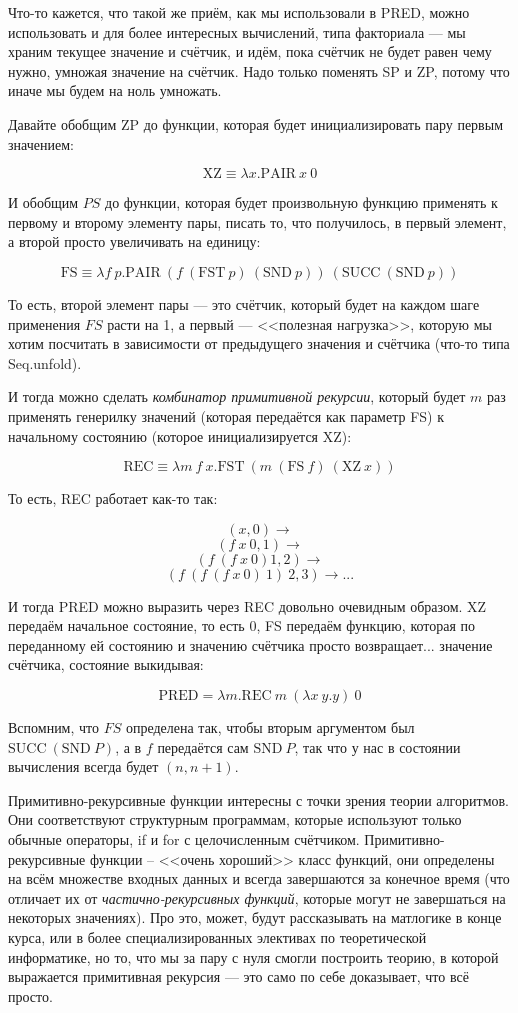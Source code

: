 \documentclass[a5paper]{article}
\begin{document}
Что-то кажется, что такой же приём, как мы использовали в PRED, можно использовать и для более интересных вычислений, типа факториала --- мы храним текущее значение и счётчик, и идём, пока счётчик не будет равен чему нужно, умножая значение на счётчик. Надо только поменять SP и ZP, потому что иначе мы будем на ноль умножать.

Давайте обобщим ZP до функции, которая будет инициализировать пару первым значением:

$$\mbox{XZ} \equiv \lambda x.\mbox{PAIR}\ x\ 0$$

И обобщим $PS$ до функции, которая будет произвольную функцию применять к первому и второму элементу пары, писать то, что получилось, в первый элемент, а второй просто увеличивать на единицу:

$$\mbox{FS} \equiv \lambda f\ p.\mbox{PAIR}\ (f\ (\mbox{FST}\ p)\ (\mbox{SND}\ p))\ (\mbox{SUCC}\ (\mbox{SND}\ p))$$

То есть, второй элемент пары --- это счётчик, который будет на каждом шаге применения $FS$ расти на 1, а первый --- <<полезная нагрузка>>, которую мы хотим посчитать в зависимости от предыдущего значения и счётчика (что-то типа Seq.unfold).

И тогда можно сделать \textit{комбинатор примитивной рекурсии}, который будет $m$ раз применять генерилку значений (которая передаётся как параметр FS) к начальному состоянию (которое инициализируется XZ):

$$\mbox{REC} \equiv \lambda m\ f\ x.\mbox{FST}\ (m\ (\mbox{FS}\ f)\ (\mbox{XZ}\ x))$$

То есть, REC работает как-то так:

$$(x, 0) \rightarrow$$
$$(f\ x\ 0, 1) \rightarrow$$
$$(f\ (f\ x\ 0) 1, 2) \rightarrow$$
$$(f\ (f\ (f\ x\ 0)\ 1)\ 2, 3) \rightarrow ...$$

И тогда PRED можно выразить через REC довольно очевидным образом. XZ передаём начальное состояние, то есть 0, FS передаём функцию, которая по переданному ей состоянию и значению счётчика просто возвращает... значение счётчика, состояние выкидывая:

$$\mbox{PRED} = \lambda m.\mbox{REC}\ m\ (\lambda x\ y.y)\ 0$$

Вспомним, что $FS$ определена так, чтобы вторым аргументом был $\mbox{SUCC}\ (\mbox{SND}\ P)$, а в $f$ передаётся сам $\mbox{SND}\ P$, так что у нас в состоянии вычисления всегда будет $(n, n + 1)$.

Примитивно-рекурсивные функции интересны с точки зрения теории алгоритмов. Они соответствуют структурным программам, которые используют только обычные операторы, if и for с целочисленным счётчиком. Примитивно-рекурсивные функции -- <<очень хороший>> класс функций, они определены на всём множестве входных данных и всегда завершаются за конечное время (что отличает их от \textit{частично-рекурсивных функций}, которые могут не завершаться на некоторых значениях). Про это, может, будут рассказывать на матлогике в конце курса, или в более специализированных элективах по теоретической информатике, но то, что мы за пару с нуля смогли построить теорию, в которой выражается примитивная рекурсия --- это само по себе доказывает, что всё просто.
\end{document}
